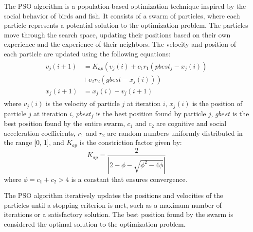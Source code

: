 The PSO algorithm is a population-based optimization technique inspired by the social behavior of birds and fish. It consists of a swarm of particles, where each particle represents a potential solution to the optimization problem. The particles move through the search space, updating their positions based on their own experience and the experience of their neighbors. The velocity and position of each particle are updated using the following equations:
\begin{align}
    \begin{aligned}
        v_j(i + 1) &= K_{ap}\left(v_j(i) + c_1 r_1 (pbest_j - x_j(i)) \right.\\
        & \left. + c_2 r_2 (gbest - x_j(i))\right)\\
        x_j(i + 1) &= x_j(i) + v_j(i + 1)
    \end{aligned}
\end{align}
where $v_j(i)$ is the velocity of particle $j$ at iteration $i$, $x_j(i)$ is the position of particle $j$ at iteration $i$, $pbest_j$ is the best position found by particle $j$, $gbest$ is the best position found by the entire swarm, $c_1$ and $c_2$ are cognitive and social acceleration coefficients, $r_1$ and $r_2$ are random numbers uniformly distributed in the range [0, 1], and $K_{ap}$ is the constriction factor given by:
\begin{equation}
    K_{ap} = \dfrac{2}{\left|2 - \phi - \sqrt{\phi^2 - 4\phi}\right|}
\end{equation}
where $\phi = c_1 + c_2 > 4$ is a constant that ensures convergence.

The PSO algorithm iteratively updates the positions and velocities of the particles until a stopping criterion is met, such as a maximum number of iterations or a satisfactory solution. The best position found by the swarm is considered the optimal solution to the optimization problem.